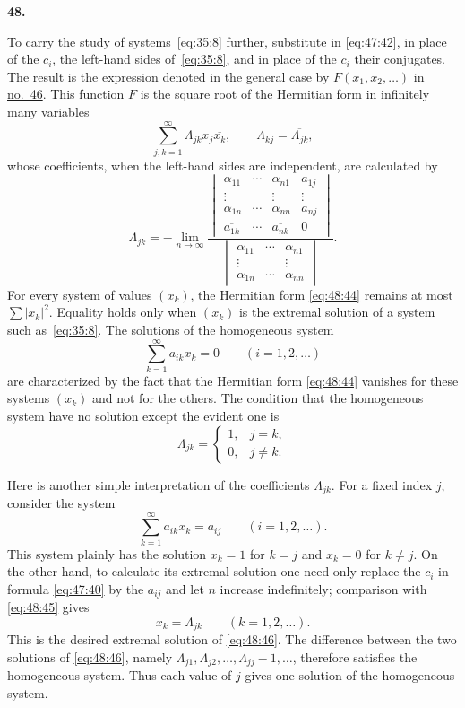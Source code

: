 \documentclass[
  paper=b5,
  fontsize=13pt,
  twoside=true,
  open=any,
  bookmarkpackage=false,
  chapterprefix=true,
  headings=normal
]{scrbook}
\theoremstyle{definition}
\newcommand{\numberedparagraph}[1]{%
  \par\medskip\phantomsection\label{sec:#1}%
  \noindent\textbf{#1.}\enspace
}
\begin{document}
\numberedparagraph{48}
To carry the study of systems~\eqref{eq:35:8} further, substitute in
\eqref{eq:47:42}, in place of the $c_i$, the left-hand sides of~\eqref{eq:35:8}, and in
place of the $\overline{c_i}$ their conjugates. The result is the expression
denoted in the general case by $F(x_1,x_2,\ldots)$ in
\hyperref[sec:46]{no.~46}. This function $F$ is the square root of the
Hermitian form in infinitely many variables
\begin{equation}
  \sum_{j,k=1}^{\infty}\Lambda_{jk}x_j\overline{x_k},
  \qquad \Lambda_{kj}=\overline{\Lambda_{jk}},
  \tag{44}\label{eq:48:44}
\end{equation}
whose coefficients, when the left-hand sides are independent, are
calculated by
\begin{equation}
 \Lambda_{jk}=-\lim_{n\to\infty}
 \frac{
 \begin{vmatrix}
  \alpha_{11}&\cdots&\alpha_{n1}&a_{1j}\\
  \vdots&&\vdots&\vdots\\
  \alpha_{1n}&\cdots&\alpha_{nn}&a_{nj}\\
  \overline{a_{1k}}&\cdots&\overline{a_{nk}}&0
 \end{vmatrix}}
 {\begin{vmatrix}
  \alpha_{11}&\cdots&\alpha_{n1}\\
  \vdots&&\vdots\\
  \alpha_{1n}&\cdots&\alpha_{nn}
 \end{vmatrix}}.
 \tag{45}\label{eq:48:45}
\end{equation}
For every system of values $(x_k)$, the Hermitian form
\eqref{eq:48:44} remains at most $\sum|x_k|^2$. Equality holds only when
$(x_k)$ is the extremal solution of a system such as~\eqref{eq:35:8}. The solutions of
the homogeneous
system
\[
  \sum_{k=1}^{\infty}a_{ik}x_k=0\qquad(i=1,2,\ldots)
\]
are characterized by the fact that the Hermitian form \eqref{eq:48:44}
vanishes for these systems $(x_k)$ and not for the others. The condition
that the homogeneous system have no solution except the evident one is
\[
  \Lambda_{jk}=\begin{cases}1,&j=k,\\0,&j\neq k.\end{cases}
\]

Here is another simple interpretation of the coefficients $\Lambda_{jk}$.
For a fixed index $j$, consider the system
\begin{equation}
  \sum_{k=1}^{\infty}a_{ik}x_k=a_{ij}\qquad(i=1,2,\ldots).
  \tag{46}\label{eq:48:46}
\end{equation}
This system plainly has the solution $x_k=1$ for $k=j$ and $x_k=0$ for
$k\neq j$. On the other hand, to calculate its extremal solution one need
only replace the $c_i$ in formula \eqref{eq:47:40} by the $a_{ij}$ and let
$n$ increase indefinitely; comparison with \eqref{eq:48:45} gives
\[
  x_k=\Lambda_{jk}\qquad(k=1,2,\ldots).
\]
This is the desired extremal solution of \eqref{eq:48:46}. The difference
between the two solutions of \eqref{eq:48:46}, namely
$\Lambda_{j1},\Lambda_{j2},\ldots,\Lambda_{jj}-1,\ldots$, therefore satisfies
the homogeneous system. Thus each value of $j$ gives one solution of the
homogeneous system.
\end{document}
